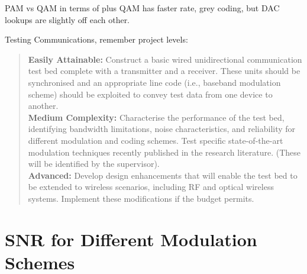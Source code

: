 \documentclass[../main.tex]{subfiles}
\begin{document}

PAM vs QAM in terms of plus QAM has faster rate, grey coding, but DAC lookups are slightly off each other.

Testing Communications, remember project levels:\\

\begin{quotation}
	\textbf{Easily Attainable:}
	Construct a basic wired unidirectional communication test bed complete with a transmitter and a receiver.
	These units should be synchronised and an appropriate line code (i.e., baseband modulation scheme) should be exploited to convey test data from one device to another.\\
	
	\textbf{Medium Complexity:}
	Characterise the performance of the test bed, identifying bandwidth limitations, noise characteristics, and reliability for different modulation and coding schemes. Test specific state-of-the-art modulation techniques recently published in the research literature. (These will be identified by the supervisor).\\
	
	\textbf{Advanced:}
	Develop design enhancements that will enable the test bed to be extended to wireless scenarios, including RF and optical wireless systems.
	Implement these modifications if the budget permits.
\end{quotation}



\section{SNR for Different Modulation Schemes}

\end{document}
